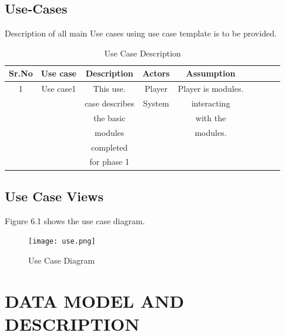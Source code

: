\documentclass[oneside,a4paper,12pt]{report}
\begin{document}
\subsection{Use-Cases}
\hspace*{0.3in}Description of all main Use cases using use case template is to be provided.\\
\begin{table}
\begin{center}
\caption{Use Case Description}
\begin{tabular}{|c|c|c|c|c|c|c|c|c|}
\hline
Sr.No&Use case&Description&Actors&Assumption\\
\hline
1&Use case1&This use.&Player&Player is modules.\\
&&case describes&System&interacting\\
&&the basic&&with the\\
&&modules&&modules.\\
&&completed&&\\
&&for phase 1&&\\
\hline
\end{tabular}
\end{center}
\end{table}
\subsection{Use Case Views}
Figure 6.1 shows the use case diagram.
\begin{figure}[h]
\centering
\texttt{[image: use.png]}
\caption{Use Case Diagram}
\end{figure}
\section{DATA MODEL AND DESCRIPTION}
\end{document}
